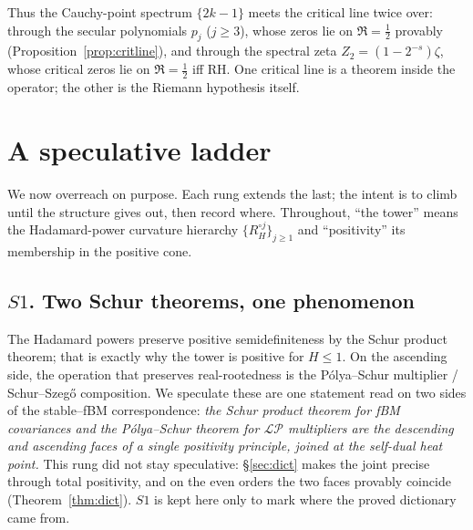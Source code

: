 \documentclass[11pt,reqno]{amsart}
\theoremstyle{plain}
\theoremstyle{definition}
\theoremstyle{remark}
\newcommand{\LP}{\mathcal{LP}}
\newcommand{\Had}{\circ}
\begin{document}
Thus the Cauchy-point spectrum $\{2k-1\}$ meets the critical line twice
over: through the secular polynomials $p_j$ ($j\ge3$), whose zeros lie on
$\Re=\tfrac12$ provably (Proposition~\ref{prop:critline}), and through the
spectral zeta $Z_2=(1-2^{-s})\zeta$, whose critical zeros lie on
$\Re=\tfrac12$ iff RH. One critical line is a theorem inside the operator;
the other is the Riemann hypothesis itself.

\section{A speculative ladder}\label{sec:spec}

We now overreach on purpose. Each rung extends the last; the intent is
to climb until the structure gives out, then record where. Throughout,
``the tower'' means the Hadamard-power curvature hierarchy
$\{R_H^{\Had j}\}_{j\ge1}$ and ``positivity'' its membership in the
positive cone.

\subsection*{$S1$. Two Schur theorems, one phenomenon}
The Hadamard powers preserve positive semidefiniteness by the Schur
product theorem; that is exactly why the tower is positive for $H\le1$.
On the ascending side, the operation that preserves real-rootedness is
the P\'olya--Schur multiplier / Schur--Szeg\H{o} composition. We
speculate these are one statement read on two sides of the
stable--fBM correspondence: \emph{the Schur product theorem for fBM
covariances and the P\'olya--Schur theorem for $\LP$ multipliers are
the descending and ascending faces of a single positivity principle,
joined at the self-dual heat point.} This rung did not stay speculative:
\S\ref{sec:dict} makes the joint precise through total positivity, and on
the even orders the two faces provably coincide (Theorem~\ref{thm:dict}).
$S1$ is kept here only to mark where the proved dictionary came from.
\end{document}
